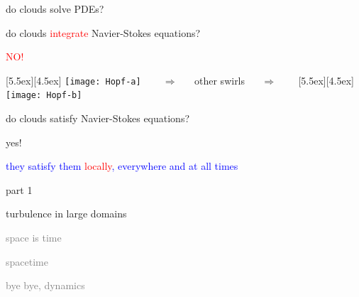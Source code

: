 \begin{frame}{do clouds solve PDEs?}

do clouds \textcolor{red}{integrate} Navier-Stokes equations?

\begin{center}
\centerline{\textcolor{red}{\Huge NO!}}

\begin{minipage}[t]{\textwidth}
	\begin{center}
\centerline{
\raisebox{-4.0ex}[5.5ex][4.5ex]
		 {\texttt{[image: Hopf-a]}}
~~~ $\Longrightarrow$ ~~ {other swirls} ~~ $\Longrightarrow$ ~~~
	\raisebox{-4.0ex}[5.5ex][4.5ex]
		 {\texttt{[image: Hopf-b]}}
          }
	\end{center}
\end{minipage}
\end{center}

do clouds satisfy Navier-Stokes equations?

\bigskip

{\Large yes!}

\centerline{
\textcolor{blue}{they satisfy them \textcolor{red}{\large locally}, everywhere and at all times}
}
\end{frame}

\begin{frame}{part 1}
\begin{enumerate}
              \item {\Large
turbulence in large domains
                  }\textcolor{gray}{\small
              \item
space is time
              \item
spacetime
              \item
bye bye, dynamics
                    }
            \end{enumerate}
\end{frame}


